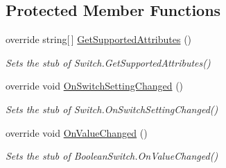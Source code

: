 \subsection*{Protected Member Functions}
\begin{DoxyCompactItemize}
\item 
override string\mbox{[}$\,$\mbox{]} \hyperlink{class_system_1_1_diagnostics_1_1_fakes_1_1_stub_boolean_switch_a954db49feafad0ac2546ff4079ddb4d6}{Get\-Supported\-Attributes} ()
\begin{DoxyCompactList}\small\item\em Sets the stub of Switch.\-Get\-Supported\-Attributes()\end{DoxyCompactList}\item 
override void \hyperlink{class_system_1_1_diagnostics_1_1_fakes_1_1_stub_boolean_switch_aefc36be92b53578107737843be080cd4}{On\-Switch\-Setting\-Changed} ()
\begin{DoxyCompactList}\small\item\em Sets the stub of Switch.\-On\-Switch\-Setting\-Changed()\end{DoxyCompactList}\item 
override void \hyperlink{class_system_1_1_diagnostics_1_1_fakes_1_1_stub_boolean_switch_abffabf5219bda5e6cb78b268c8a8fa5e}{On\-Value\-Changed} ()
\begin{DoxyCompactList}\small\item\em Sets the stub of Boolean\-Switch.\-On\-Value\-Changed()\end{DoxyCompactList}\end{DoxyCompactItemize}
